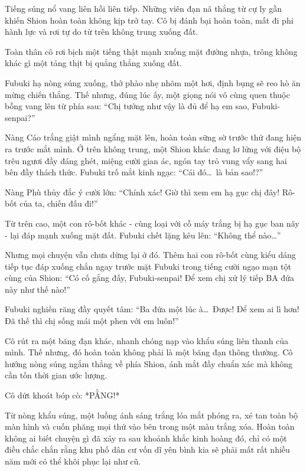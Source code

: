 \documentclass[../main.tex]{subfiles}
\begin{document}
Tiếng súng nổ vang liên hồi liên tiếp. Những viên đạn nã thẳng từ cự ly gần khiến Shion hoàn toàn không kịp trở tay. Cô bị đánh bại hoàn toàn, mất đi phi hành lực và rơi tự do từ trên không trung xuống đất.


Toàn thân cô rơi bịch một tiếng thật mạnh xuống mặt đường nhựa, trông không khác gì một tảng thịt bị quẳng thẳng xuống đất.

Fubuki hạ nòng súng xuống, thở phào nhẹ nhõm một hơi, định bụng sẽ reo hò ăn mừng chiến thắng. Thế nhưng, đúng lúc ấy, một giọng nói vô cùng quen thuộc bỗng vang lên từ phía sau: ``Chị tưởng như vậy là đủ để hạ em sao, Fubuki-senpai?''

Nàng Cáo trắng giật mình ngẩng mặt lên, hoàn toàn sững sờ trước thứ đang hiện ra trước mắt mình. Ở trên không trung, một Shion khác đang lơ lửng với điệu bộ trêu ngươi đầy đáng ghét, miệng cười gian ác, ngón tay trỏ vung vẩy sang hai bên đầy thách thức. Fubuki trố mắt kinh ngạc: ``Cái đó\dots\ là bản sao!?''

Nàng Phù thủy đắc ý cười lớn: ``Chính xác! Giờ thì xem em hạ gục chị đây! Rô-bốt của ta, chiến đấu đi!''

Từ trên cao, một con rô-bốt khác - cùng loại với cỗ máy trắng bị hạ gục ban nãy - lại đáp mạnh xuống mặt đất. Fubuki chết lặng kêu lên: ``Không thể nào\dots''


Nhưng mọi chuyện vẫn chưa dừng lại ở đó. Thêm hai con rô-bốt cùng kiểu dáng tiếp tục đáp xuống chắn ngay trước mặt Fubuki trong tiếng cười ngạo mạn tột cùng của Shion: ``Có cố gắng đấy, Fubuki-senpai! Để xem chị xử lý tiếp BA đứa này như thế nào!''

Fubuki nghiến răng đầy quyết tâm: ``Ba đứa một lúc à\dots\ Được! Để xem ai lì hơn! Đã thế thì chị sống mái một phen với em luôn!''

Cô rút ra một băng đạn khác, nhanh chóng nạp vào khẩu súng liên thanh của mình. Thế nhưng, đó hoàn toàn không phải là một băng đạn thông thường. Cô hướng nòng súng ngắm thẳng về phía Shion, ánh mắt đầy chuẩn xác mà không cần tốn thời gian ước lượng.


Cô dứt khoát bóp cò: *PẰNG!*

Từ nòng khẩu súng, một luồng ánh sáng trắng lóa mắt phóng ra, xé tan toàn bộ màn hình và cuốn phăng mọi thứ vào bên trong một màu trắng xóa. Hoàn toàn không ai biết chuyện gì đã xảy ra sau khoảnh khắc kinh hoàng đó, chỉ có một điều chắc chắn rằng khu phố dân cư vốn dĩ yên bình kia sẽ phải mất rất nhiều năm mới có thể khôi phục lại như cũ.
\end{document}
